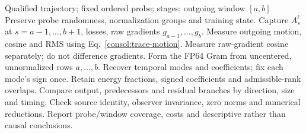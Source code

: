 \begin{algorithm}[H]
\caption{Fixed-probe architectural oscillation tracing}
\label{consol:algorithm-trace}
\begin{algorithmic}[1]
\Require Qualified trajectory; fixed ordered probe; stages; outgoing window $[a,b]$
\State Preserve probe randomness, normalization groups and training state.
\State Capture $A_s^\ell$ at $s=a-1,\ldots,b+1$, losses, raw gradients $g_{a-1},\ldots,g_b$.
  \State Measure outgoing motion, cosine and RMS using Eq.~\eqref{consol:trace-motion}.
  \State Measure raw-gradient cosine separately; do not difference gradients.
\EndFor
{}
  \State Form the FP64 Gram from uncentered, unnormalized rows $a,\ldots,b$.
  \State Recover temporal modes and coefficients; fix each mode's sign once.
  \State Retain energy fractions, signed coefficients and admissible-rank overlaps.
\EndFor
\State Compare output, predecessors and residual branches by direction, size and timing.
\State Check source identity, observer invariance, zero norms and numerical reductions.
\State Report probe/window coverage, costs and descriptive rather than causal conclusions.
\end{algorithmic}
\end{algorithm}
